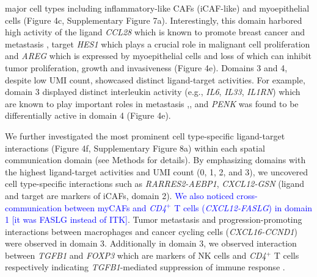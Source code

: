 major cell types including inflammatory-like CAFs (iCAF-like) and myoepithelial cells (Figure 4c, Supplementary Figure 7a). Interestingly, this domain harbored high activity of the ligand \textit{CCL28} which is known to promote breast cancer and metastasis \citep{Yang2017}, target \textit{HES1} which plays a crucial role in malignant cell proliferation \citep{Li2018} and \textit{AREG} which is expressed by myoepithelial cells and loss of which can inhibit tumor proliferation, growth and invasiveness \citep{Mao2018} (Figure 4e). Domains 3 and 4, despite low UMI count, showcased distinct ligand-target activities. For example, domain 3 displayed distinct interleukin activity (e.g., \textit{IL6}, \textit{IL33}, \textit{IL1RN}) which are known to play important roles in metastasis \citep{ARA20101223},\citep{10.3389/fimmu.2014.00141},\citep{Shiiba2015} and \textit{PENK} was found to be differentially active in domain 4 (Figure 4e). \par 


We further investigated the most prominent cell type-specific ligand-target interactions (Figure 4f, Supplementary Figure 8a) within each spatial communication domain (see Methods for details). By emphasizing domains with the highest ligand-target activities and UMI count (0, 1, 2, and 3), we uncovered cell type-specific interactions such as \textit{RARRES2-AEBP1}, \textit{CXCL12-GSN} (ligand and target are markers of iCAFs, domain 2). \textcolor{blue}{We also noticed cross-communication between myCAFs and \textit{CD4}$^{+}$ T cells (\textit{CXCL12-FASLG}) in domain 1 [it was FASLG instead of ITK]}. Tumor metastasis and progression-promoting interactions between macrophages and cancer cycling cells (\textit{CXCL16-CCND1}) \citep{OT3690, cancers13143568} were observed in domain 3. Additionally in domain 3, we observed interaction between \textit{TGFB1} and \textit{FOXP3} which are markers of NK cells and \textit{CD4}$^{+}$ T cells respectively indicating \textit{TGFB1}-mediated suppression of immune response \citep{10.1371/journal.pone.0076379, doi.org/10.1111/imm.12941}. \par  

